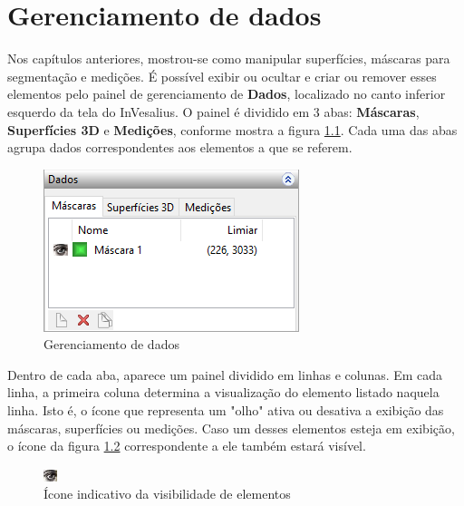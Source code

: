 \chapter{Gerenciamento de dados}

Nos capítulos anteriores, mostrou-se como manipular superfícies, máscaras para segmentação
e medições. É possível exibir ou ocultar e criar ou remover esses elementos pelo painel de
gerenciamento de \textbf{Dados}, localizado no canto inferior esquerdo da tela do InVesalius.
O painel é dividido em 3 abas: \textbf{Máscaras}, \textbf{Superfícies 3D} e \textbf{Medições},
conforme mostra a figura \ref{fig:volumetric_data}. Cada uma das abas agrupa dados
correspondentes aos elementos a que se referem.


\begin{figure}[!htb]
\centering
\includegraphics[scale=0.7]{../user_guide_figures/invesalius_screen/painel_mask_manager_pt.png}
\caption{Gerenciamento de dados}
\label{fig:volumetric_data}
\end{figure}

Dentro de cada aba, aparece um painel dividido em linhas e colunas. Em cada linha, a primeira
coluna determina a visualização do elemento listado naquela linha. Isto é, o ícone que
representa um "olho" ativa ou desativa a exibição das máscaras, superfícies ou medições. Caso
um desses elementos esteja em exibição, o ícone da figura \ref{fig:disable_mask} correspondente
a ele também estará visível.

\newpage

\begin{figure}[!htb]
\centering
\includegraphics[scale=0.9]{../user_guide_figures/invesalius_screen/eye.jpg}
\caption{Ícone indicativo da visibilidade de elementos}
\label{fig:disable_mask}
\end{figure}

